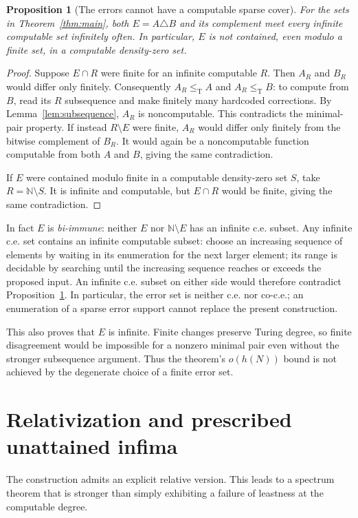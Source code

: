 \documentclass[11pt,a4paper]{article}
\newcommand{\N}{\mathbb N}
\newcommand{\leT}{\leq_{\mathrm T}}
\newtheorem{proposition}[theorem]{Proposition}
\theoremstyle{definition}
\theoremstyle{remark}
\begin{document}
\begin{proposition}[The errors cannot have a computable sparse cover]\label{prop:immune}
For the sets in Theorem~\ref{thm:main}, both $E=A\triangle B$ and its complement meet every infinite computable set infinitely often. In particular, $E$ is not contained, even modulo a finite set, in a computable density-zero set.
\end{proposition}
\begin{proof}
Suppose $E\cap R$ were finite for an infinite computable $R$. Then $A_R$ and $B_R$ would differ only finitely. Consequently $A_R\leT A$ and $A_R\leT B$: to compute from $B$, read its $R$ subsequence and make finitely many hardcoded corrections. By Lemma~\ref{lem:subsequence}, $A_R$ is noncomputable. This contradicts the minimal-pair property. If instead $R\setminus E$ were finite, $A_R$ would differ only finitely from the bitwise complement of $B_R$. It would again be a noncomputable function computable from both $A$ and $B$, giving the same contradiction.

If $E$ were contained modulo finite in a computable density-zero set $S$, take $R=\N\setminus S$. It is infinite and computable, but $E\cap R$ would be finite, giving the same contradiction.
\end{proof}

In fact $E$ is \emph{bi-immune}: neither $E$ nor $\N\setminus E$ has an infinite c.e. subset. Any infinite c.e. set contains an infinite computable subset: choose an increasing sequence of elements by waiting in its enumeration for the next larger element; its range is decidable by searching until the increasing sequence reaches or exceeds the proposed input. An infinite c.e. subset on either side would therefore contradict Proposition~\ref{prop:immune}. In particular, the error set is neither c.e. nor co-c.e.; an enumeration of a sparse error support cannot replace the present construction.

This also proves that $E$ is infinite. Finite changes preserve Turing degree, so finite disagreement would be impossible for a nonzero minimal pair even without the stronger subsequence argument. Thus the theorem's $o(h(N))$ bound is not achieved by the degenerate choice of a finite error set.

\section{Relativization and prescribed unattained infima}\label{sec:relative}
The construction admits an explicit relative version. This leads to a spectrum theorem that is stronger than simply exhibiting a failure of leastness at the computable degree.
\end{document}
